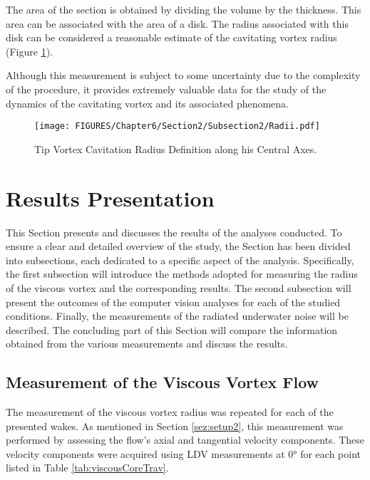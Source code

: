 The area of the section is obtained by dividing the volume by the thickness. This area can be associated with the area of a disk. 
The radius associated with this disk can be considered a reasonable estimate of the cavitating vortex radius (Figure \ref{fig:Radii}).

Although this measurement is subject to some uncertainty due to the complexity of the procedure, it provides extremely valuable data for the study of the dynamics of the cavitating vortex and its associated phenomena.

\begin{figure}[h!]
    \centering
    \texttt{[image: FIGURES/Chapter6/Section2/Subsection2/Radii.pdf]}
    \caption{Tip Vortex Cavitation Radius Definition along his Central Axes.}
    \label{fig:Radii}
\end{figure}

\section{Results Presentation}

This Section presents and discusses the results of the analyses conducted. To ensure a clear and detailed overview of the study, the Section has been divided into subsections, each dedicated to a specific aspect of the analysis.
Specifically, the first subsection will introduce the methods adopted for measuring the radius of the viscous vortex and the corresponding results. The second subsection will present the outcomes of the computer vision analyses for each of the studied conditions. Finally, the measurements of the radiated underwater noise will be described.
The concluding part of this Section will compare the information obtained from the various measurements and discuss the results.

\subsection{Measurement of the Viscous Vortex Flow}
\label{sez:viscousCore}

The measurement of the viscous vortex radius was repeated for each of the presented wakes. As mentioned in Section \ref{sez:setup2}, this measurement was performed by assessing the flow's axial and tangential velocity components.
These velocity components were acquired using LDV measurements at 0° for each point listed in Table \ref{tab:viscousCoreTrav}.

